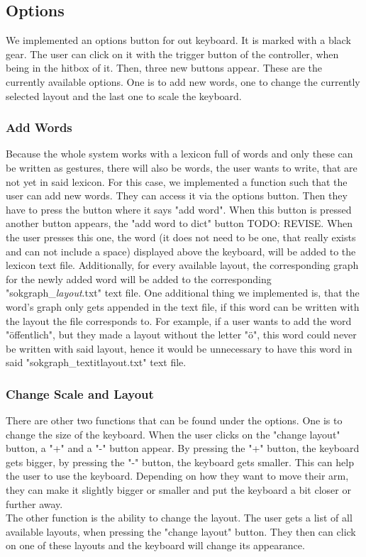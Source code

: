 \subsection{Options}
We implemented an options button for out keyboard. It is marked with a black gear. The user can click on it with the trigger button of the controller, when being in the hitbox of it. Then, three new buttons appear. These are the currently available options. One is to add new words, one to change the currently selected layout and the last one to scale the keyboard.

\subsubsection{Add Words}
Because the whole system works with a lexicon full of words and only these can be written as gestures, there will also be words, the user wants to write, that are not yet in said lexicon. For this case, we implemented a function such that the user can add new words. They can access it via the options button. Then they have to press the button where it says "add word". When this button is pressed another button appears, the "add word to dict" button TODO: REVISE. When the user presses this one, the word (it does not need to be one, that really exists and can not include a space) displayed above the keyboard, will be added to the lexicon text file. Additionally, for every available layout, the corresponding graph for the newly added word will be added to the corresponding "sokgraph\_\textit{layout}.txt" text file. One additional thing we implemented is, that the word's graph only gets appended in the text file, if this word can be written with the layout the file corresponds to. For example, if a user wants to add the word "öffentlich", but they made a layout without the letter "ö", this word could never be written with said layout, hence it would be unnecessary to have this word in said "sokgraph\_textit{layout}.txt" text file.

\subsubsection{Change Scale and Layout}
There are other two functions that can be found under the options. One is to change the size of the keyboard. When the user clicks on the "change layout" button, a "+" and a "-" button appear. By pressing the "+" button, the keyboard gets bigger, by pressing the "-" button, the keyboard gets smaller. This can help the user to use the keyboard. Depending on how they want to move their arm, they can make it slightly bigger or smaller and put the keyboard a bit closer or further away.\\
The other function is the ability to change the layout. The user gets a list of all available layouts, when pressing the "change layout" button. They then can click on one of these layouts and the keyboard will change its appearance.

